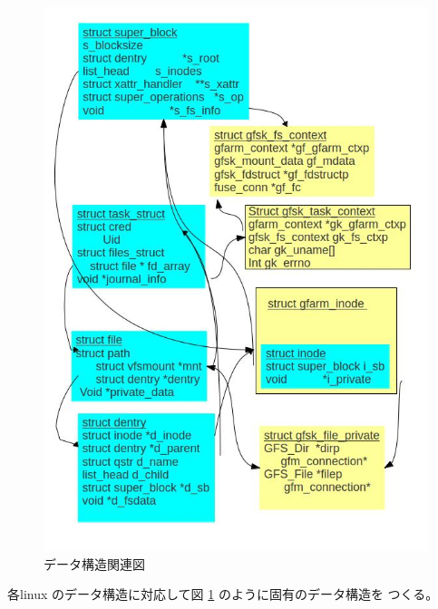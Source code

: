 \begin{figure}[htb]\begin{center}
\includegraphics[bb=00 00 800 1000,scale=0.5]{fsdata.jpg}
\caption{データ構造関連図}\label{fig:data}
\end{center}\end{figure}

各linux のデータ構造に対応して図 \ref{fig:data} のように固有のデータ構造を
つくる。

